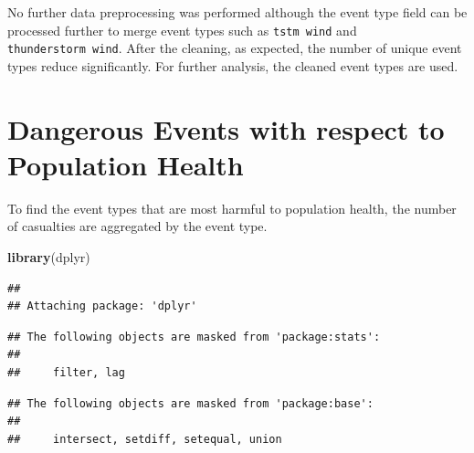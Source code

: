 \documentclass[]{article}
\newenvironment{Shaded}{\begin{snugshade}}{\end{snugshade}}
\newcommand{\KeywordTok}[1]{\textcolor[rgb]{0.13,0.29,0.53}{\textbf{#1}}}
\newcommand{\DataTypeTok}[1]{\textcolor[rgb]{0.13,0.29,0.53}{#1}}
\newcommand{\DecValTok}[1]{\textcolor[rgb]{0.00,0.00,0.81}{#1}}
\newcommand{\StringTok}[1]{\textcolor[rgb]{0.31,0.60,0.02}{#1}}
\newcommand{\CommentTok}[1]{\textcolor[rgb]{0.56,0.35,0.01}{\textit{#1}}}
\newcommand{\OperatorTok}[1]{\textcolor[rgb]{0.81,0.36,0.00}{\textbf{#1}}}
\newcommand{\NormalTok}[1]{#1}
\begin{document}
No further data preprocessing was performed although the event type
field can be processed further to merge event types such as
\texttt{tstm\ wind} and \texttt{thunderstorm\ wind}. After the cleaning,
as expected, the number of unique event types reduce significantly. For
further analysis, the cleaned event types are used.

\section{Dangerous Events with respect to Population
Health}\label{dangerous-events-with-respect-to-population-health}

To find the event types that are most harmful to population health, the
number of casualties are aggregated by the event type.

\begin{Shaded}
\begin{Highlighting}[]
\KeywordTok{library}\NormalTok{(dplyr)}
\end{Highlighting}
\end{Shaded}

\begin{verbatim}
## 
## Attaching package: 'dplyr'
\end{verbatim}

\begin{verbatim}
## The following objects are masked from 'package:stats':
## 
##     filter, lag
\end{verbatim}

\begin{verbatim}
## The following objects are masked from 'package:base':
## 
##     intersect, setdiff, setequal, union
\end{verbatim}

\begin{Shaded}
\end{Shaded}
\end{document}
